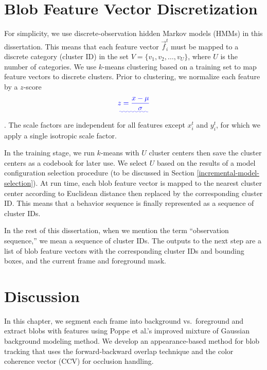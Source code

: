 \section{Blob Feature Vector Discretization}
\label{sec:blob-discretization}

For simplicity, we use discrete-observation hidden Markov models (HMMs) 
in this dissertation. This means that each feature vector $\vec{f}_i^t$ must
be mapped to a discrete category (cluster ID) in the set $V = \{ v_1,
v_2, \ldots, v_U \}$, where $U$ is the number of categories. We use
$k$-means clustering based on a training set to map feature vectors to
discrete clusters.  Prior to clustering, we normalize each feature by
a $z$-score \DIFaddbegin {}\begin{equation}\DIFadd{
    \label{eq:z-score}
    z = \frac{x - \mu}{\sigma}
}\end{equation}
\DIFaddend . The scale factors are independent for all features
except $x_i^t$ and $y_i^t$, for which we apply a single isotropic
scale factor.

In the training stage, we run $k$-means with $U$ cluster centers then
save the cluster centers as a codebook for later use. We select $U$
based on the results of a model configuration selection procedure (to
be discussed in Section \ref{incremental-model-selection}). At run
time, each blob feature vector is mapped to the nearest cluster center
according to Euclidean distance then replaced by the corresponding
cluster ID. This means that a behavior sequence is finally represented
as a sequence of cluster IDs.

In the rest of this dissertation, when we mention the term
``observation sequence,'' we mean a sequence of cluster IDs. The
outputs to the next step are a list of blob feature vectors with the
corresponding cluster IDs and bounding boxes, and the current frame
and foreground mask.

\section{Discussion}
\label{sec:blob-discussion}

In this chapter, we segment each frame into background vs.\ foreground
and extract blobs with features using Poppe et al.'s improved mixture
of Gaussian background modeling method. We develop an appearance-based
method for blob tracking that uses the forward-backward overlap
technique and the color coherence vector (CCV) for occlusion handling.

